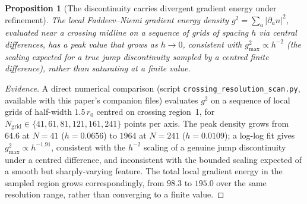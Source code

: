 \documentclass[11pt,a4paper]{article}
\newtheorem{proposition}[theorem]{Proposition}
\theoremstyle{definition}\newtheorem{definition}[theorem]{Definition}
\theoremstyle{remark}
\theoremstyle{definition}\newtheorem{construction}[theorem]{Construction}
\begin{document}
\begin{proposition}[The discontinuity carries divergent gradient
  energy under refinement]
\label{P16:prop:divergent_energy}
The local Faddeev--Niemi gradient energy density
$g^2=\sum_a|\partial_a n|^2$, evaluated near a crossing midline on a
sequence of grids of spacing $h$ via central differences, has a peak
value that grows as $h\to0$, consistent with $g^2_{\max}\propto h^{-2}$
(the scaling expected for a true jump discontinuity sampled by a
centred finite difference), rather than saturating at a finite value.
\end{proposition}

\begin{proof}[Evidence]
A direct numerical comparison (script \texttt{crossing\_resolution\allowbreak\_scan.py},
available with this paper's companion files) evaluates $g^2$ on a
sequence of local grids of half-width $1.5\,r_0$ centred on crossing
region~1, for $N_{\mathrm{grid}}\in\{41,61,81,121,161,241\}$ points
per axis. The peak density grows from $64.6$ at $N=41$
($h=0.0656$) to $1964$ at $N=241$ ($h=0.0109$); a log-log fit gives
$g^2_{\max}\propto h^{-1.91}$, consistent with the $h^{-2}$ scaling
of a genuine jump discontinuity under a centred difference, and
inconsistent with the bounded scaling expected of a smooth but
sharply-varying feature. The total local gradient energy in the
sampled region grows correspondingly, from $98.3$ to $195.0$ over the
same resolution range, rather than converging to a finite value.
\end{proof}
\end{document}
